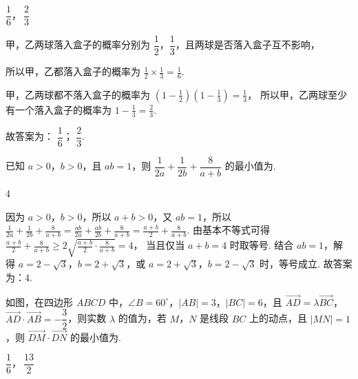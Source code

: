 \begin{answer}
\(\dfrac16\)，\(\ \dfrac23\)
\end{answer}

\begin{solution}
甲，乙两球落入盒子的概率分别为 \( \dfrac12 \)，\( \dfrac13 \)，且两球是否落入盒子互不影响，

所以甲，乙都落入盒子的概率为
\(\frac12\times\frac13=\frac16\).

甲，乙两球都不落入盒子的概率为
\(\left( 1-\frac12 \right)\left( 1-\frac13 \right)=\frac13\)，
所以甲，乙两球至少有一个落入盒子的概率为
\(1-\frac13=\frac23\).

故答案为： \( \dfrac16 \)； \( \dfrac23 \).
\end{solution}

\begin{problem}
已知 \(a>0\)，\(b>0\)，且 \(ab=1\)，则 \(\dfrac1{2a}+\dfrac1{2b}+\dfrac8{a+b}\) 的最小值为\fillinblank{}.
\end{problem}

\begin{answer}
4
\end{answer}

\begin{solution}
因为 \( a>0 \)，\( b>0 \)，所以 \( a+b>0 \)，又 \( ab=1 \)，所以
\(\frac1{2a}+\frac1{2b}+\frac8{a+b}
=\frac{ab}{2a}+\frac{ab}{2b}+\frac8{a+b}
=\frac{a+b}{2}+\frac8{a+b}\).
由基本不等式可得
\(\frac{a+b}{2}+\frac8{a+b}\ge2\sqrt{\frac{a+b}{2}\cdot\frac8{a+b}}=4\)，
当且仅当 \( a+b=4 \) 时取等号.
结合 \( ab=1 \)，解得 \( a=2-\sqrt3 \)，\( b=2+\sqrt3 \)，或 \( a=2+\sqrt3 \)，\( b=2-\sqrt3 \) 时，等号成立.
故答案为：4.
\end{solution}

\begin{problem}
如图，在四边形 \(ABCD\) 中，\(\angle B=60^\circ\)，\(|AB|=3\)，\(|BC|=6\)，且 \(\overrightarrow{AD}=\lambda\overrightarrow{BC}\)，\(\overrightarrow{AD}\cdot\overrightarrow{AB}=-\dfrac32\)，则实数 \(\lambda\) 的值为\fillinblank{}，若 \(M\)，\(N\) 是线段 \(BC\) 上的动点，且 \(|MN|=1\)，则 \(\overrightarrow{DM}\cdot\overrightarrow{DN}\) 的最小值为\fillinblank{}.

\begin{center}
\end{center}
\end{problem}

\begin{answer}
\(\dfrac16\)，\(\ \dfrac{13}{2}\)
\end{answer}


